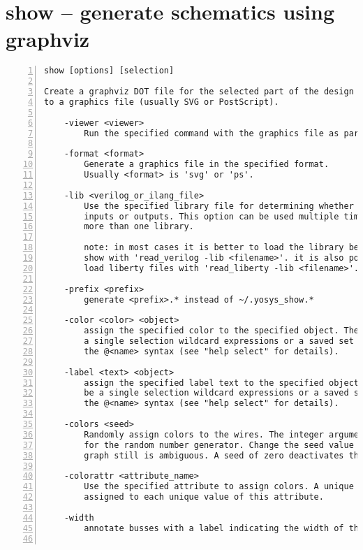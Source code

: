 \section{show -- generate schematics using graphviz}
\label{cmd:show}
\begin{lstlisting}[numbers=left,frame=single]
    show [options] [selection]

Create a graphviz DOT file for the selected part of the design and compile it
to a graphics file (usually SVG or PostScript).

    -viewer <viewer>
        Run the specified command with the graphics file as parameter.

    -format <format>
        Generate a graphics file in the specified format.
        Usually <format> is 'svg' or 'ps'.

    -lib <verilog_or_ilang_file>
        Use the specified library file for determining whether cell ports are
        inputs or outputs. This option can be used multiple times to specify
        more than one library.

        note: in most cases it is better to load the library before calling
        show with 'read_verilog -lib <filename>'. it is also possible to
        load liberty files with 'read_liberty -lib <filename>'.

    -prefix <prefix>
        generate <prefix>.* instead of ~/.yosys_show.*

    -color <color> <object>
        assign the specified color to the specified object. The object can be
        a single selection wildcard expressions or a saved set of objects in
        the @<name> syntax (see "help select" for details).

    -label <text> <object>
        assign the specified label text to the specified object. The object can
        be a single selection wildcard expressions or a saved set of objects in
        the @<name> syntax (see "help select" for details).

    -colors <seed>
        Randomly assign colors to the wires. The integer argument is the seed
        for the random number generator. Change the seed value if the colored
        graph still is ambiguous. A seed of zero deactivates the coloring.

    -colorattr <attribute_name>
        Use the specified attribute to assign colors. A unique color is
        assigned to each unique value of this attribute.

    -width
        annotate busses with a label indicating the width of the bus.


\end{lstlisting}
